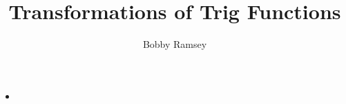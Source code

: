 \documentclass{ximera}
\author{Bobby Ramsey}
\title{Transformations of Trig Functions}
\begin{document}
\begin{abstract}
\end{abstract}
\maketitle


\begin{objectives}

	\item 
		\begin{itemize}
			\item 
		\end{itemize}
\end{objectives}
\end{document}
